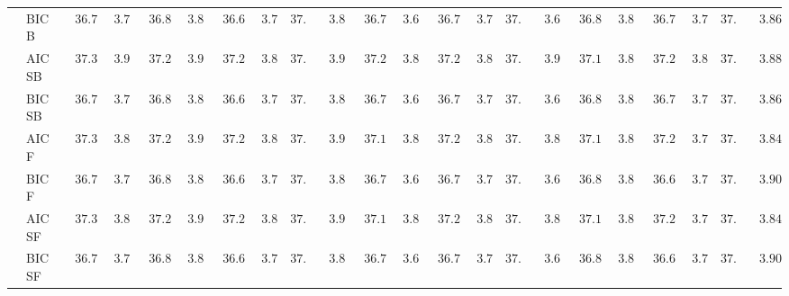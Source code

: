 \begin{tabular}{p{0.2cm}p{1cm}|p{0.6cm}p{0.6cm}|p{0.6cm}p{0.6cm}p{0.6cm}p{0.6cm}p{0.6cm}p{0.6cm}|p{0.6cm}p{0.6cm}p{0.6cm}p{0.6cm}p{0.6cm}p{0.6cm}|p{0.6cm}p{0.6cm}p{0.6cm}p{0.6cm}p{0.6cm}p{0.6cm}}
 & BIC B  & $\phantom{0}36.75$ & $\phantom{0}3.76$ & $\phantom{0}36.84$ & $\phantom{0}3.84$ & $\phantom{0}36.67$ & $\phantom{0}3.78$ & $37.06$ & $\phantom{0}3.85$ & $\phantom{0}36.78$ & $\phantom{0}3.68$ & $\phantom{0}36.79$ & $\phantom{0}3.71$ & $37.15$ & $\phantom{0}3.67$ & $\phantom{0}36.82$ & $\phantom{0}3.82$ & $\phantom{0}36.72$ & $\phantom{0}3.70$ & $37.03$ & $\phantom{0}3.86$ \\
 & AIC SB  & $\phantom{0}37.31$ & $\phantom{0}3.90$ & $\phantom{0}37.29$ & $\phantom{0}3.91$ & $\phantom{0}37.22$ & $\phantom{0}3.85$ & $37.39$ & $\phantom{0}3.92$ & $\phantom{0}37.21$ & $\phantom{0}3.86$ & $\phantom{0}37.22$ & $\phantom{0}3.88$ & $37.25$ & $\phantom{0}3.91$ & $\phantom{0}37.19$ & $\phantom{0}3.83$ & $\phantom{0}37.22$ & $\phantom{0}3.80$ & $37.30$ & $\phantom{0}3.88$ \\
 & BIC SB  & $\phantom{0}36.75$ & $\phantom{0}3.76$ & $\phantom{0}36.84$ & $\phantom{0}3.84$ & $\phantom{0}36.67$ & $\phantom{0}3.78$ & $37.06$ & $\phantom{0}3.85$ & $\phantom{0}36.78$ & $\phantom{0}3.68$ & $\phantom{0}36.79$ & $\phantom{0}3.71$ & $37.15$ & $\phantom{0}3.67$ & $\phantom{0}36.82$ & $\phantom{0}3.82$ & $\phantom{0}36.72$ & $\phantom{0}3.70$ & $37.03$ & $\phantom{0}3.86$ \\
 & AIC F  & $\phantom{0}37.30$ & $\phantom{0}3.88$ & $\phantom{0}37.29$ & $\phantom{0}3.91$ & $\phantom{0}37.22$ & $\phantom{0}3.85$ & $37.32$ & $\phantom{0}3.93$ & $\phantom{0}37.18$ & $\phantom{0}3.82$ & $\phantom{0}37.21$ & $\phantom{0}3.87$ & $37.15$ & $\phantom{0}3.89$ & $\phantom{0}37.18$ & $\phantom{0}3.82$ & $\phantom{0}37.20$ & $\phantom{0}3.78$ & $37.21$ & $\phantom{0}3.84$ \\
 & BIC F  & $\phantom{0}36.75$ & $\phantom{0}3.76$ & $\phantom{0}36.84$ & $\phantom{0}3.84$ & $\phantom{0}36.67$ & $\phantom{0}3.78$ & $37.01$ & $\phantom{0}3.80$ & $\phantom{0}36.78$ & $\phantom{0}3.68$ & $\phantom{0}36.75$ & $\phantom{0}3.75$ & $37.10$ & $\phantom{0}3.66$ & $\phantom{0}36.82$ & $\phantom{0}3.81$ & $\phantom{0}36.68$ & $\phantom{0}3.70$ & $37.01$ & $\phantom{0}3.90$ \\
 & AIC SF  & $\phantom{0}37.30$ & $\phantom{0}3.88$ & $\phantom{0}37.29$ & $\phantom{0}3.91$ & $\phantom{0}37.22$ & $\phantom{0}3.85$ & $37.32$ & $\phantom{0}3.93$ & $\phantom{0}37.18$ & $\phantom{0}3.82$ & $\phantom{0}37.21$ & $\phantom{0}3.87$ & $37.15$ & $\phantom{0}3.89$ & $\phantom{0}37.18$ & $\phantom{0}3.82$ & $\phantom{0}37.20$ & $\phantom{0}3.78$ & $37.20$ & $\phantom{0}3.84$ \\
 & BIC SF  & $\phantom{0}36.75$ & $\phantom{0}3.76$ & $\phantom{0}36.84$ & $\phantom{0}3.84$ & $\phantom{0}36.67$ & $\phantom{0}3.78$ & $37.01$ & $\phantom{0}3.80$ & $\phantom{0}36.78$ & $\phantom{0}3.68$ & $\phantom{0}36.75$ & $\phantom{0}3.75$ & $37.09$ & $\phantom{0}3.64$ & $\phantom{0}36.82$ & $\phantom{0}3.81$ & $\phantom{0}36.68$ & $\phantom{0}3.70$ & $37.01$ & $\phantom{0}3.90$ \\

\end{tabular}
